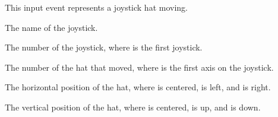 \documentclass[letterpaper,10pt,english]{sphinxmanual}
\begin{document}
\begin{fulllineitems}
\label{input:sge.input.JoystickHatMove}
This input event represents a joystick hat moving.

\begin{fulllineitems}
\label{input:sge.input.JoystickHatMove.js_name}
The name of the joystick.

\end{fulllineitems}


\begin{fulllineitems}
\label{input:sge.input.JoystickHatMove.js_id}
The number of the joystick, where  is the first joystick.

\end{fulllineitems}


\begin{fulllineitems}
\label{input:sge.input.JoystickHatMove.hat}
The number of the hat that moved, where  is the first axis
on the joystick.

\end{fulllineitems}


\begin{fulllineitems}
\label{input:sge.input.JoystickHatMove.x}
The horizontal position of the hat, where  is centered,
 is left, and  is right.

\end{fulllineitems}


\begin{fulllineitems}
\label{input:sge.input.JoystickHatMove.y}
The vertical position of the hat, where  is centered, 
is up, and  is down.

\end{fulllineitems}


\end{fulllineitems}
\end{document}
